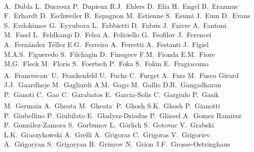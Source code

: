 \begin{flushleft}
A.~Dubla\And
L.~Ducroux\And
P.~Dupieux\And
R.J.~Ehlers\And
D.~Elia\And
H.~Engel\And
B.~Erazmus\textsuperscript{,}\And
F.~Erhardt\And
D.~Eschweiler\And
B.~Espagnon\And
M.~Estienne\And
S.~Esumi\And
J.~Eum\And
D.~Evans\And
S.~Evdokimov\And
G.~Eyyubova\And
L.~Fabbietti\And
D.~Fabris\And
J.~Faivre\And
A.~Fantoni\And
M.~Fasel\And
L.~Feldkamp\And
D.~Felea\And
A.~Feliciello\And
G.~Feofilov\And
J.~Ferencei\And
A.~Fern\'{a}ndez T\'{e}llez\And
E.G.~Ferreiro\And
A.~Ferretti\And
A.~Festanti\And
J.~Figiel\And
M.A.S.~Figueredo\And
S.~Filchagin\And
D.~Finogeev\And
F.M.~Fionda\And
E.M.~Fiore\And
M.G.~Fleck\And
M.~Floris\And
S.~Foertsch\And
P.~Foka\And
S.~Fokin\And
E.~Fragiacomo\And
A.~Francescon\textsuperscript{,}\And
U.~Frankenfeld\And
U.~Fuchs\And
C.~Furget\And
A.~Furs\And
M.~Fusco Girard\And
J.J.~Gaardh{\o}je\And
M.~Gagliardi\And
A.M.~Gago\And
M.~Gallio\And
D.R.~Gangadharan\And
P.~Ganoti\And
C.~Gao\And
C.~Garabatos\And
E.~Garcia-Solis\And
C.~Gargiulo\And
P.~Gasik\And
M.~Germain\And
A.~Gheata\And
M.~Gheata\textsuperscript{,}\And
P.~Ghosh\And
S.K.~Ghosh\And
P.~Gianotti\And
P.~Giubellino\And
P.~Giubilato\And
E.~Gladysz-Dziadus\And
P.~Gl\"{a}ssel\And
A.~Gomez Ramirez\And
P.~Gonz\'{a}lez-Zamora\And
S.~Gorbunov\And
L.~G\"{o}rlich\And
S.~Gotovac\And
V.~Grabski\And
L.K.~Graczykowski\And
A.~Grelli\And
A.~Grigoras\And
C.~Grigoras\And
V.~Grigoriev\And
A.~Grigoryan\And
S.~Grigoryan\And
B.~Grinyov\And
N.~Grion\And
J.F.~Grosse-Oetringhaus\And

\end{flushleft}
